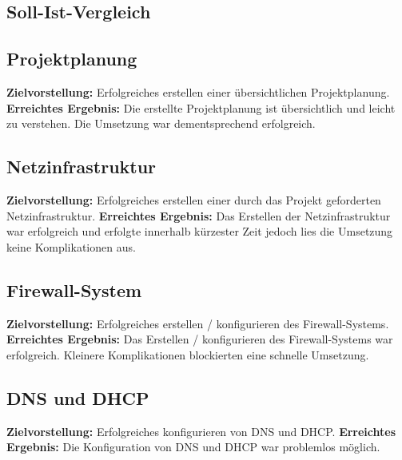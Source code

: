 \documentclass{scrartcl}
\begin{document}
\begin{flushleft}
    \section{Soll-Ist-Vergleich}
    
    \subsection{Projektplanung}
    \textbf{Zielvorstellung:} \newline
    Erfolgreiches erstellen einer übersichtlichen Projektplanung. \newline
    \textbf{Erreichtes Ergebnis:} \newline
    Die erstellte Projektplanung ist übersichtlich und leicht zu verstehen. Die Umsetzung war dementsprechend erfolgreich. \newline

    \subsection{Netzinfrastruktur}
    \textbf{Zielvorstellung:} \newline
    Erfolgreiches erstellen einer durch das Projekt geforderten Netzinfrastruktur. \newline
    \textbf{Erreichtes Ergebnis:} \newline
    Das Erstellen der Netzinfrastruktur war erfolgreich und erfolgte innerhalb kürzester Zeit jedoch lies die Umsetzung keine Komplikationen aus. \newline

    \subsection{Firewall-System}
    \textbf{Zielvorstellung:} \newline
    Erfolgreiches erstellen / konfigurieren des Firewall-Systems. \newline
    \textbf{Erreichtes Ergebnis:} \newline
    Das Erstellen / konfigurieren des Firewall-Systems war erfolgreich. Kleinere Komplikationen blockierten eine schnelle Umsetzung. \newline

    \subsection{DNS und DHCP}
    \textbf{Zielvorstellung:} \newline
    Erfolgreiches konfigurieren von DNS und DHCP. \newline
    \textbf{Erreichtes Ergebnis:} \newline
    Die Konfiguration von DNS und DHCP war problemlos möglich. \newline
 

\end{flushleft}
\end{document}
